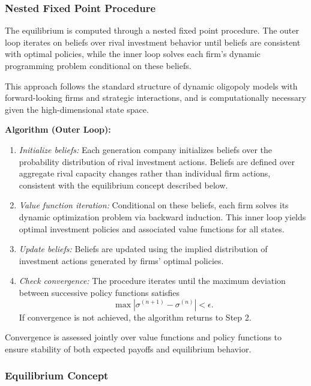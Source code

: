 \documentclass[12pt]{article}
\begin{document}
\subsubsection{Nested Fixed Point Procedure}\label{subsec:nfxp}

The equilibrium is computed through a nested fixed point procedure. The outer loop iterates on beliefs over rival investment behavior until beliefs are consistent with optimal policies, while the inner loop solves each firm’s dynamic programming problem conditional on these beliefs.

This approach follows the standard structure of dynamic oligopoly models with forward-looking firms and strategic interactions, and is computationally necessary given the high-dimensional state space.

\vspace{1em}
\noindent\textbf{Algorithm (Outer Loop):}
\begin{enumerate}
\item \textit{Initialize beliefs:} Each generation company initializes beliefs over the probability distribution of rival investment actions. Beliefs are defined over aggregate rival capacity changes rather than individual firm actions, consistent with the equilibrium concept described below.

\item \textit{Value function iteration:} Conditional on these beliefs, each firm solves its dynamic optimization problem via backward induction. This inner loop yields optimal investment policies and associated value functions for all states.

\item \textit{Update beliefs:} Beliefs are updated using the implied distribution of investment actions generated by firms’ optimal policies.

\item \textit{Check convergence:} The procedure iterates until the maximum deviation between successive policy functions satisfies
\[
    \max |\sigma^{(n+1)} - \sigma^{(n)}| < \epsilon.
\]
If convergence is not achieved, the algorithm returns to Step 2.


\end{enumerate}

Convergence is assessed jointly over value functions and policy functions to ensure stability of both expected payoffs and equilibrium behavior.

\subsubsection{Equilibrium Concept}\label{subsec:equilibrium_concept}
\end{document}
